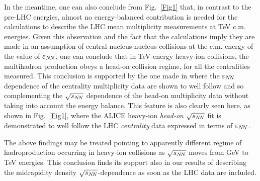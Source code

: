 \documentclass[twocolumn,showpacs,preprintnumbers,prd,superscriptaddress,nofootinbib]{revtex4}
\begin{document}
 In the meantime,
 one can also 
  conclude 
from Fig.~\ref{Fig1} 
 that, in contrast to the pre-LHC energies,
 almost no energy-balanced contribution
 is needed  for the
 calculations 
to
describe the
LHC mean multiplicity measurements at TeV c.m. energies.
  Given this observation and the fact that   
 the calculations imply they are made 
 in an assumption of central nucleus-nucleus collisions at the c.m. energy 
of 
 the value of 
 $\varepsilon_{N\!N}$, 
 one
 can conclude that
 in TeV-energy
  heavy-ion collisions,
    the multihadron production obeys a head-on collision regime,
 for all the
 centralities
 measured. 
  This conclusion is supported 
 by the one made in 
\cite{edwardPRD} where the 
$\varepsilon_{N\!N}$ dependence of the  centrality multiplicity data are shown to 
well 
follow 
and so complementing the $\sqrt{s_{N\!N}}$ 
dependence of the  head-on multiplicity data without taking 
into 
account the energy balance.
This feature is also clearly seen here,  
 as shown in 
 Fig.~\ref{Fig1}, 
 where 
 the 
 ALICE  heavy-ion
 {\it head-on}  $\sqrt{s_{N\!N}}$ fit 
   is 
 demonstrated
to well follow the LHC {\it centrality} data 
expressed in terms of $\varepsilon_{N\!N}$.


  The above findings may be treated  pointing to  apparently different 
regime of
hadroproduction
  occurring
 in heavy-ion
collisions
 as $\sqrt{s_{N\!N}}$
 moves from 
 GeV 
 to TeV energies.
 This conclusion finds its support 
 also 
 in 
 our results  
 of 
 describing the 
 midrapidity density  $\sqrt{s_{N\!N}}$-dependence as soon as the LHC data are 
included.
\end{document}
